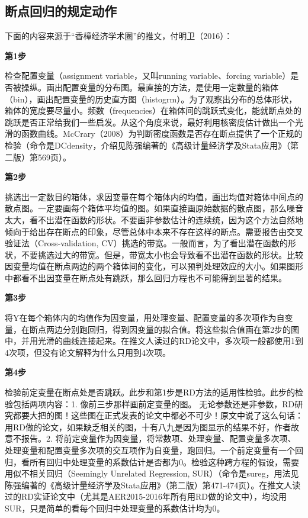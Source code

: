 \documentclass[cn,10pt,math=newtx,citestyle=gb7714-2015,bibstyle=gb7714-2015]{elegantbook}
\begin{document}
	\subsection{断点回归的规定动作}
	
	下面的内容来源于“香樟经济学术圈”的推文，付明卫（2016）：
	
	\textbf{第1步}
	
	检查配置变量（assignment variable，又叫running variable、forcing variable）是否被操纵。画出配置变量的分布图。最直接的方法，是使用一定数量的箱体（bin），画出配置变量的历史直方图（histogrm）。为了观察出分布的总体形状，箱体的宽度要尽量小。频数（frequencies）在箱体间的跳跃式变化，能就断点处的跳跃是否正常给我们一些启发。从这个角度来说，最好利用核密度估计做出一个光滑的函数曲线。McCrary（2008）为判断密度函数是否存在断点提供了一个正规的检验（命令是DCdensity，介绍见陈强编著的《高级计量经济学及Stata应用》（第二版）第569页）。
	
	\textbf{第2步}
	
	挑选出一定数目的箱体，求因变量在每个箱体内的均值，画出均值对箱体中间点的散点图。一定要画每个箱体平均值的图。如果直接画原始数据的散点图，那么噪音太大，看不出潜在函数的形状。不要画非参数估计的连续统，因为这个方法自然地倾向于给出存在断点的印象，尽管总体中本来不存在这样的断点。需要报告由交叉验证法（Cross-validation, CV）挑选的带宽。一般而言，为了看出潜在函数的形状，不要挑选过大的带宽。但是，带宽太小也会导致看不出潜在函数的形状。比较因变量均值在断点两边的两个箱体间的变化，可以预判处理效应的大小。如果图形中都看不出因变量在断点处有跳跃，那么回归方程也不可能得到显著的结果。
	
	\textbf{第3步}
	
	将Y在每个箱体内的均值作为因变量，用处理变量、配置变量的多次项作为自变量，在断点两边分别跑回归，得到因变量的拟合值。将这些拟合值画在第2步的图中，并用光滑的曲线连接起来。在推文人读过的RD论文中，多次项一般都使用1到4次项，但没有论文解释为什么只用到4次项。
	
	\textbf{第4步}
	
	检验前定变量在断点处是否跳跃。此步和第1步是RD方法的适用性检验。此步的检验包括两项内容：1. 像前三步那样画前定变量的图。 无论参数还是非参数，RD研究都要大把的图！这些图在正式发表的论文中都必不可少！原文中说了这么句话：用RD做的论文，如果缺乏相关的图，十有八九是因为图显示的结果不好，作者故意不报告。2. 将前定变量作为因变量，将常数项、处理变量、配置变量多次项、处理变量和配置变量多次项的交互项作为自变量，跑回归。一个前定变量有一个回归，看所有回归中处理变量的系数估计是否都为0。检验这种跨方程的假设，需要用似不相关回归（Seemingly Unrelated Regression, SUR）（命令是sureg，用法见陈强编著的《高级计量经济学及Stata应用》（第二版）第471-474页）。在推文人读过的RD实证论文中（尤其是AER2015-2016年所有用RD做的论文中），均没用SUR，只是简单的看每个回归中处理变量的系数估计均为0。
	
\end{document}
